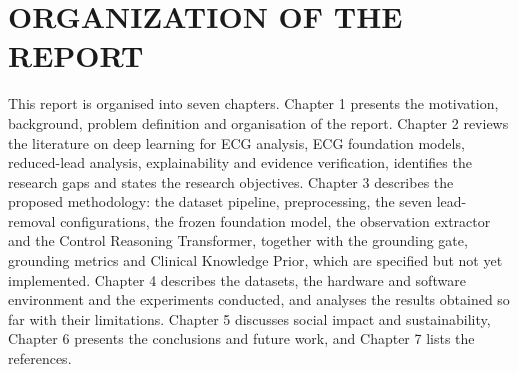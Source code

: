\section{ORGANIZATION OF THE REPORT}
This report is organised into seven chapters. Chapter 1 presents the motivation, background, problem definition and organisation of the report. Chapter 2 reviews the literature on deep learning for ECG analysis, ECG foundation models, reduced-lead analysis, explainability and evidence verification, identifies the research gaps and states the research objectives. Chapter 3 describes the proposed methodology: the dataset pipeline, preprocessing, the seven lead-removal configurations, the frozen foundation model, the observation extractor and the Control Reasoning Transformer, together with the grounding gate, grounding metrics and Clinical Knowledge Prior, which are specified but not yet implemented. Chapter 4 describes the datasets, the hardware and software environment and the experiments conducted, and analyses the results obtained so far with their limitations. Chapter 5 discusses social impact and sustainability, Chapter 6 presents the conclusions and future work, and Chapter 7 lists the references.